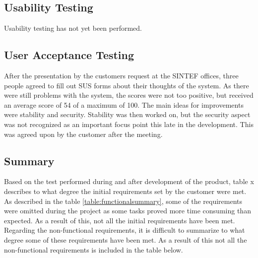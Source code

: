 		\subsection{Usability Testing}
		Usability testing has not yet been performed.

		\subsection{User Acceptance Testing}
		After the presentation by the customers request at the SINTEF offices, three people agreed to fill out SUS forms about their thoughts of the system. As there were still problems with the system, the scores were not too positive, but received an average score of 54 of a maximum of 100. The main ideas for improvements were stability and security. Stability was then worked on, but the security aspect was not recognized as an important focus point this late in the development. This was agreed upon by the customer after the meeting.

		\subsection{Summary}
		Based on the test performed during and after development of the product, table x describes to what degree the initial requirements set by the customer were met. As described in the table \ref{table:functionalsummary}, some of the requirements were omitted during the project as some tasks proved more time consuming than expected. As a result of this, not all the initial requirements have been met. \\
		\newline
		Regarding the non-functional requirements, it is difficult to summarize to what degree some of these requirements have been met. As a result of this not all the non-functional requirements is included in the table below.

